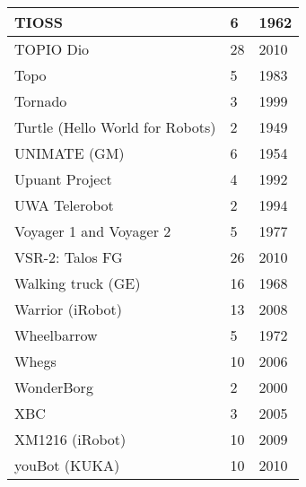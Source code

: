 \begin{center}
\begin{longtable}{l | l | l }
TIOSS	&	6	&	1962	\\	\hline
TOPIO Dio	&	28	&	2010	\\	\hline
Topo	&	5	&	1983	\\	\hline
Tornado	&	3	&	1999	\\	\hline
Turtle (Hello World for Robots)	&	2	&	1949	\\	\hline
UNIMATE (GM)	&	6	&	1954	\\	\hline
Upuant Project	&	4	&	1992	\\	\hline
UWA Telerobot	&	2	&	1994	\\	\hline
Voyager 1 and Voyager 2	&	5	&	1977	\\	\hline
VSR-2: Talos FG	&	26	&	2010	\\	\hline
Walking truck (GE)	&	16	&	1968	\\	\hline
Warrior (iRobot)	&	13	&	2008	\\	\hline
Wheelbarrow	&	5	&	1972	\\	\hline
Whegs	&	10	&	2006	\\	\hline
WonderBorg	&	2	&	2000	\\	\hline
XBC	&	3	&	2005	\\	\hline
XM1216 (iRobot)	&	10	&	2009	\\	\hline
youBot (KUKA)	&	10	&	2010	\\	\hline
\end{longtable}
\end{center}
